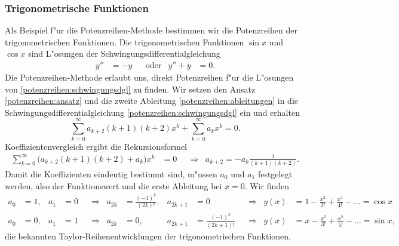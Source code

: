 \subsubsection{Trigonometrische Funktionen}
Als Beispiel f"ur die Potenzreihen-Methode bestimmen wir die Potenzreihen
der trigonometrischen Funktionen.
Die trigonometrischen Funktionen $\sin x$ und $\cos x$ sind L"osungen
der Schwingungsdifferentialgleichung
\begin{equation}
\begin{aligned}
y''&=-y
&&\text{oder}&
y''+y&=0.
\end{aligned}
\label{potenzreihen:schwingungsdgl}
\end{equation}
Die Potenzreihen-Methode erlaubt uns, direkt Potenzreihen f"ur die
L"osungen von \eqref{potenzreihen:schwingungsdgl} zu finden.
Wir setzen den Ansatz \eqref{potenzreihen:ansatz} und die zweite Ableitung
\eqref{potenzreihen:ableitungen} in die Schwingungsdifferentialgleichung
\eqref{potenzreihen:schwingungsdgl} ein und erhalten
\begin{equation}
\sum_{k=0}^\infty a_{k+2}(k+1)(k+2)x^k 
+
\sum_{k=0}^\infty a_kx^k
=0.
\end{equation}
Koeffizientenvergleich ergibt die Rekursionsformel
\begin{equation}
\begin{aligned}
\sum_{k=0}^\infty \bigl(a_{k+2}(k+1)(k+2) + a_k\bigr)x^k
&=0
&&\Rightarrow&
a_{k+2}=-a_k\frac1{(k+1)(k+2)}.
\end{aligned}
\end{equation}
Damit die Koeffizienten eindeutig bestimmt sind, m"ussen $a_0$
und $a_1$ festgelegt werden, also der Funktionswert  und die erste
Ableitung bei $x=0$.
Wir finden
\begin{equation*}
\begin{aligned}
a_0&=1,&a_1&=0
&&\Rightarrow&
a_{2k}&=\frac{(-1)^k}{(2k)!},&a_{2k+1}&=0
&&\Rightarrow&
y(x)&=1-\frac{x^2}{2!}+\frac{x^4}{4!}-\dots=\cos x
\\
a_0&=0,&a_1&=1
&&\Rightarrow&
a_{2k}&=0,&a_{2k+1}&=\frac{(-1)^k}{(2k+1)!}
&&\Rightarrow&
y(x)&=x-\frac{x^3}{3!}+\frac{x^5}{5!}-\dots=\sin x,
\end{aligned}
\end{equation*}
die bekannten Taylor-Reihenentwicklungen der trigonometrischen Funktionen.

